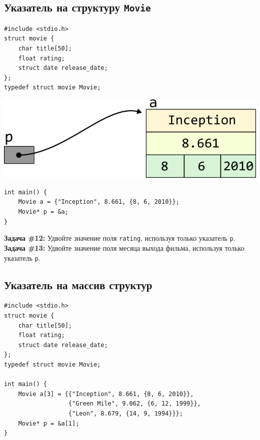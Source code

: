 \documentclass{article}
\begin{document}
\subsection*{Указатель на структуру \texttt{Movie}}
\begin{multicols}{2}
\begin{lstlisting}
#include <stdio.h>
struct movie {
    char title[50];
    float rating;
    struct date release_date;
};
typedef struct movie Movie;
\end{lstlisting}
\columnbreak
\begin{center}
\includegraphics[scale=1]{../images/pointer_schemes/pointer_to_struct_movie.png}
\end{center}
\end{multicols}
\begin{lstlisting}
int main() {
	Movie a = {"Inception", 8.661, {8, 6, 2010}};
	Movie* p = &a;
}
\end{lstlisting}
\textbf{Задача \#12:} Удвойте значение поля \texttt{rating}, используя только указатель \texttt{p}.\\
\textbf{Задача \#13:} Удвойте значение поля месяца выхода фильма, используя только указатель \texttt{p}.

\subsection*{Указатель на массив структур}
\begin{lstlisting}
#include <stdio.h>
struct movie {
	char title[50];
	float rating;
	struct date release_date;
};
typedef struct movie Movie;

int main() {
	Movie a[3] = {{"Inception", 8.661, {8, 6, 2010}}, 
	              {"Green Mile", 9.062, {6, 12, 1999}}, 
	              {"Leon", 8.679, {14, 9, 1994}}};
	Movie* p = &a[1];
}
\end{lstlisting}
\end{document}
